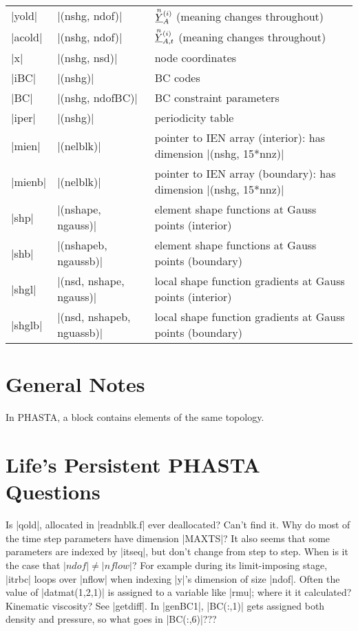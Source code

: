 \documentclass[11pt]{article}
\begin{document}
\begin{center}
\begin{tabular}{@{}lll@{}}
|yold|   & |(nshg, ndof)|            & $\oset{n}{\ul{Y}}_{A}^{(i)}$ (meaning changes throughout) \\
|acold|  & |(nshg, ndof)|            & $\oset{n}{\ul{Y}}_{A,t}^{(i)}$ (meaning changes throughout) \\
|x|      & |(nshg, nsd)|             & node coordinates \\
|iBC|    & |(nshg)|                  & BC codes \\
|BC|     & |(nshg, ndofBC)|          & BC constraint parameters \\
|iper|   & |(nshg)|				    & periodicity table \\
|mien|   & |(nelblk)|			    & pointer to IEN array (interior): has dimension |(nshg, 15*nnz)| \\
|mienb|  & |(nelblk)|			    & pointer to IEN array (boundary): has dimension |(nshg, 15*nnz)| \\
|shp|    & |(nshape, ngauss)|        & element shape functions at Gauss points (interior) \\
|shb|    & |(nshapeb, ngaussb)|      & element shape functions at Gauss points (boundary) \\
|shgl|   & |(nsd, nshape, ngauss)|   & local shape function gradients at Gauss points (interior) \\
|shglb|  & |(nsd, nshapeb, nguassb)| & local shape function gradients at Gauss points (boundary) \\
\bottomrule
\end{tabular}
\label{tbl:symbols}
\end{center}

\section{General Notes}
\begin{outline}[deep]
\1 In PHASTA, a block contains elements of the same topology.
\end{outline}

\section{Life's Persistent PHASTA Questions}
\begin{outline}[deep]
	\1 Is |qold|, allocated in |readnblk.f| ever deallocated? Can't find it.
	\1 Why do most of the time step parameters have dimension |MAXTS|?
		\2 It also seems that some parameters are indexed by |itseq|, but don't change from step to step.
	\1 When is it the case that $|ndof| \ne |nflow|$? For example during its limit-imposing stage, |itrbc| loops over |nflow| when indexing |y|'s dimension of size |ndof|.
	\1 Often the value of |datmat(1,2,1)| is assigned to a variable like |rmu|; where it it calculated? Kinematic viscosity? See |getdiff|.
	\1 In |genBC1|, |BC(:,1)| gets assigned both density and pressure, so what goes in |BC(:,6)|???
\end{outline}

\label{lastpage}
\end{document}
